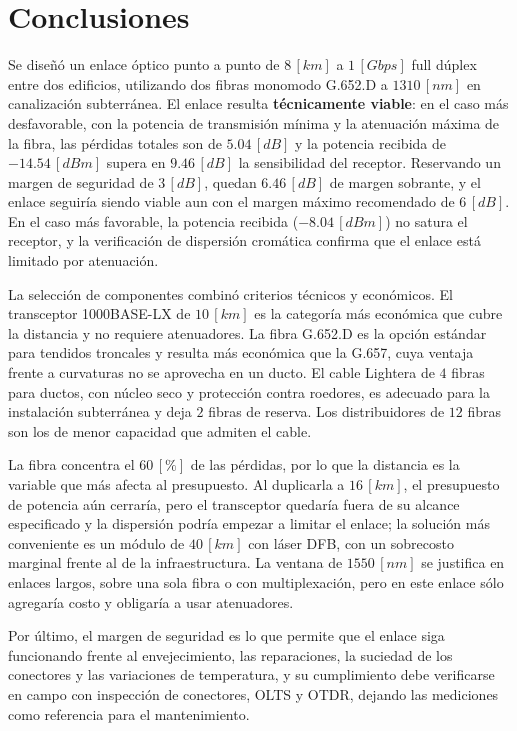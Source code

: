 \documentclass[12pt]{article}
\begin{document}
\section{Conclusiones}
\label{sec_6}
Se diseñó un enlace óptico punto a punto de $8 \, [km]$ a $1 \, [Gbps]$ full dúplex entre dos edificios, utilizando dos fibras monomodo G.652.D a $1310 \, [nm]$ en canalización subterránea. El enlace resulta \textbf{técnicamente viable}: en el caso más desfavorable, con la potencia de transmisión mínima y la atenuación máxima de la fibra, las pérdidas totales son de $5.04 \, [dB]$ y la potencia recibida de $-14.54 \, [dBm]$ supera en $9.46 \, [dB]$ la sensibilidad del receptor. Reservando un margen de seguridad de $3 \, [dB]$, quedan $6.46 \, [dB]$ de margen sobrante, y el enlace seguiría siendo viable aun con el margen máximo recomendado de $6 \, [dB]$. En el caso más favorable, la potencia recibida ($-8.04 \, [dBm]$) no satura el receptor, y la verificación de dispersión cromática confirma que el enlace está limitado por atenuación.

La selección de componentes combinó criterios técnicos y económicos. El transceptor 1000BASE-LX de $10 \, [km]$ es la categoría más económica que cubre la distancia y no requiere atenuadores. La fibra G.652.D es la opción estándar para tendidos troncales y resulta más económica que la G.657, cuya ventaja frente a curvaturas no se aprovecha en un ducto. El cable Lightera de $4$ fibras para ductos, con núcleo seco y protección contra roedores, es adecuado para la instalación subterránea y deja $2$ fibras de reserva. Los distribuidores de $12$ fibras son los de menor capacidad que admiten el cable.

La fibra concentra el $60 \, [\%]$ de las pérdidas, por lo que la distancia es la variable que más afecta al presupuesto. Al duplicarla a $16 \, [km]$, el presupuesto de potencia aún cerraría, pero el transceptor quedaría fuera de su alcance especificado y la dispersión podría empezar a limitar el enlace; la solución más conveniente es un módulo de $40 \, [km]$ con láser DFB, con un sobrecosto marginal frente al de la infraestructura. La ventana de $1550 \, [nm]$ se justifica en enlaces largos, sobre una sola fibra o con multiplexación, pero en este enlace sólo agregaría costo y obligaría a usar atenuadores.

Por último, el margen de seguridad es lo que permite que el enlace siga funcionando frente al envejecimiento, las reparaciones, la suciedad de los conectores y las variaciones de temperatura, y su cumplimiento debe verificarse en campo con inspección de conectores, OLTS y OTDR, dejando las mediciones como referencia para el mantenimiento.



\newpage
\nocite{*}

\newpage
\printbibliography[heading=bibintoc, title={Bibliografía y Referencias}]
\end{document}
